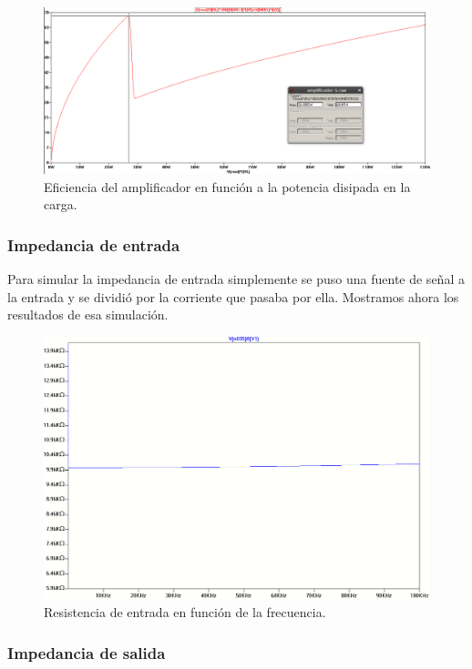\begin{figure}[H]
\centering
\includegraphics[width=1\textwidth]{img/eficiencia.png}
\caption{Eficiencia del amplificador en función a la potencia disipada en la carga.}
\label{simul_efi}
\end{figure}

\subsubsection{Impedancia de entrada}

Para simular la impedancia de entrada simplemente se puso una fuente de señal a la entrada y se dividió por la corriente que pasaba por ella. Mostramos ahora los resultados de esa simulación.

\begin{figure}[H]
\centering
\includegraphics[width=1\textwidth]{img/Rin.png}
\caption{Resistencia de entrada en función de la frecuencia.}
\label{Rin_sim}
\end{figure}

\subsubsection{Impedancia de salida}

